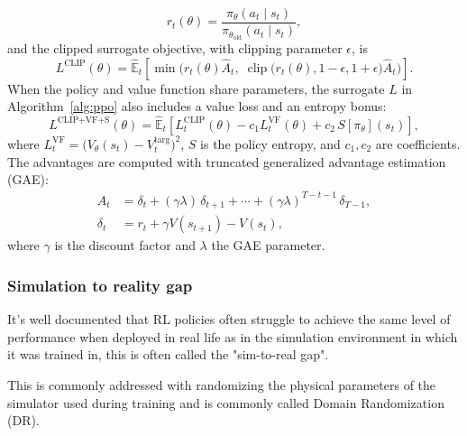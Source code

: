 \begin{equation}
    r_t(\theta) = \frac{\pi_\theta(a_t \mid s_t)}{\pi_{\theta_{\text{old}}}(a_t \mid s_t)},
\end{equation}
and the clipped surrogate objective, with clipping parameter $\epsilon$, is
\begin{equation}
    L^{\text{CLIP}}(\theta) = \hat{\mathbb{E}}_t\!\left[
        \min\!\big( r_t(\theta)\hat{A}_t,\;
        \operatorname{clip}\!\big(r_t(\theta), 1-\epsilon, 1+\epsilon\big)\hat{A}_t \big)
    \right].
\end{equation}
When the policy and value function share parameters, the surrogate $L$ in
Algorithm~\ref{alg:ppo} also includes a value loss and an entropy bonus:
\begin{equation}
    L^{\text{CLIP+VF+S}}(\theta) = \hat{\mathbb{E}}_t\!\left[
        L_t^{\text{CLIP}}(\theta) - c_1 L_t^{\text{VF}}(\theta) + c_2\, S[\pi_\theta](s_t)
    \right],
\end{equation}
where $L_t^{\text{VF}} = \big(V_\theta(s_t) - V_t^{\text{targ}}\big)^2$, $S$ is the
policy entropy, and $c_1, c_2$ are coefficients. The advantages are computed with
truncated generalized advantage estimation (GAE):
\begin{align}
    \hat{A}_t &= \delta_t + (\gamma\lambda)\,\delta_{t+1} + \cdots
                + (\gamma\lambda)^{T-t-1}\,\delta_{T-1}, \\
    \delta_t  &= r_t + \gamma V(s_{t+1}) - V(s_t),
\end{align}
where $\gamma$ is the discount factor and $\lambda$ the GAE parameter.


\subsubsection{Simulation to reality gap}
It's well documented that RL policies often struggle to achieve the same level of performance when deployed in real life as in the simulation environment in which it was trained in, this is often called the "sim-to-real gap".

This is commonly addressed with randomizing the physical parameters of the simulator used during training and is commonly called Domain Randomization (DR).